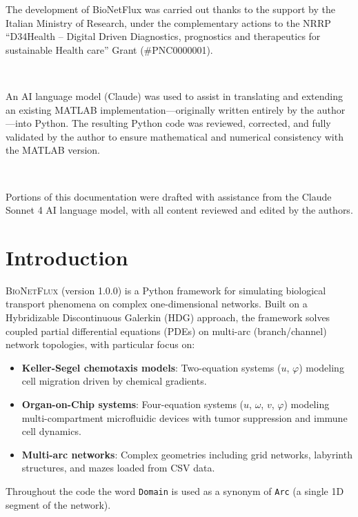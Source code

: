 \documentclass[11pt,a4paper]{article}
\newcommand{\code}[1]{\texttt{#1}}
\newcommand{\bionetflux}{\textsc{BioNetFlux}}
\begin{document}
The development of BioNetFlux was carried out thanks to the support by the Italian Ministry of Research, under the complementary actions to the NRRP ``D34Health -- Digital Driven Diagnostics, prognostics and therapeutics for sustainable Health care'' Grant (\#PNC0000001).

\


An AI language model (Claude)
was used to assist in translating and extending an existing MATLAB implementation—originally
written entirely by the author—into Python. The resulting Python code was reviewed, corrected,
and fully validated by the author to ensure mathematical and numerical consistency with the
MATLAB version. 

\

Portions of this documentation were drafted with assistance from the Claude Sonnet 4 AI language model, with all content reviewed and edited by the authors.


\clearpage

\section{Introduction}
\label{sec:introduction}

\bionetflux{} (version 1.0.0) is a Python framework for simulating biological transport phenomena on complex one-dimensional networks. Built on a Hybridizable Discontinuous Galerkin (HDG) approach, the framework solves coupled partial differential equations (PDEs) on multi-arc (branch/channel) network topologies, with particular focus on:

\begin{itemize}
    \item \textbf{Keller-Segel chemotaxis models}: Two-equation systems ($u$, $\varphi$) modeling cell migration driven by chemical gradients.
    \item \textbf{Organ-on-Chip systems}: Four-equation systems ($u$, $\omega$, $v$, $\varphi$) modeling multi-compartment microfluidic devices with tumor suppression and immune cell dynamics.
    \item \textbf{Multi-arc networks}: Complex geometries including grid networks, labyrinth structures, and mazes loaded from CSV data.
\end{itemize}

\begin{notebox}
Throughout the code the word \code{Domain} is used as a synonym of \code{Arc} (a single 1D segment of the network).
\end{notebox}
\end{document}
